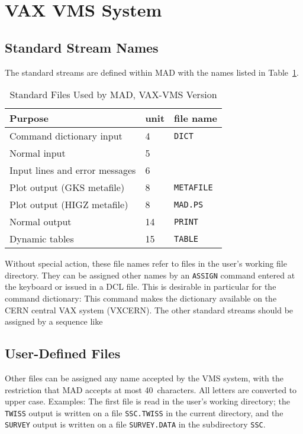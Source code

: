 \section{VAX VMS System}
\label{S-VMS}
\subsection{Standard Stream Names}
The standard streams are defined within MAD with the names listed in
Table~\ref{T-VAX}.
\begin{table}[ht]
\caption{Standard Files Used by MAD, VAX-VMS Version}
\vspace{1ex}
\label{T-VAX}
\centering
\begin{tabular}{|l|l|l|}
\hline
Purpose                         &unit  &file name \\
\hline
Command dictionary input        & 4    &{\tt DICT} \\
Normal input                    & 5    & \\
Input lines and error messages  & 6    & \\
Plot output (GKS metafile)      & 8    &{\tt METAFILE} \\
Plot output (HIGZ metafile)     & 8    &{\tt MAD.PS} \\
Normal output                   &14    &{\tt PRINT} \\
Dynamic tables                  &15    &{\tt TABLE} \\
\hline
\end{tabular}
\end{table}
Without special action, these file names refer to files in the
user's working file directory.
They can be assigned other names by an {\tt ASSIGN} command
entered at the keyboard or issued in a DCL file.
This is desirable in particular for the command dictionary:
This command makes the dictionary available on the CERN central
VAX system (VXCERN).
The other standard streams should be assigned by a sequence like
 
\subsection{User-Defined Files}
Other files can be assigned any name accepted by the VMS system,
with the restriction that MAD accepts at most 40~characters.
All letters are converted to upper case.
Examples:
The first file is read in the user's working directory;
the {\tt TWISS} output is written
on a file {\tt SSC.TWISS} in the current
directory,
and the {\tt SURVEY} output is written on a file {\tt SURVEY.DATA}
in the subdirectory {\tt SSC}.
 
